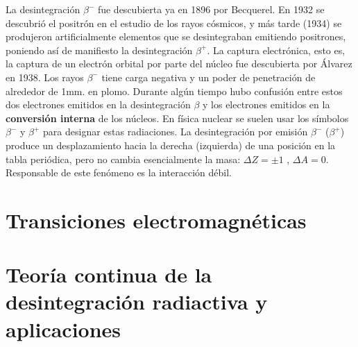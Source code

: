 La desintegración $\beta^-$ fue descubierta ya en 1896 por Becquerel. En 1932 se descubrió el positrón en el estudio de los rayos cósmicos, y más tarde (1934) se produjeron artificialmente elementos que se desintegraban emitiendo positrones, poniendo así de manifiesto la desintegración $\beta^+$. La captura electrónica, esto es, la captura de un electrón orbital por parte del núcleo fue descubierta por Álvarez en 1938. Los rayos $\beta^-$ tiene carga negativa y un poder de penetración de alrededor de 1mm. en plomo. Durante algún tiempo hubo confusión entre estos dos electrones emitidos en la desintegración $\beta$ y los electrones emitidos en la \textbf{conversión interna} de los núcleos. En física nuclear se suelen usar los símbolos $\beta^-$ y $\beta^+$ para designar estas radiaciones. La desintegración por emisión $\beta^-$ ($\beta^+$) produce un desplazamiento hacia la derecha (izquierda) de una posición en la tabla periódica, pero no cambia esencialmente la masa: $\Delta Z= \pm 1$ , $\Delta A = 0$. Responsable de este fenómeno es la interacción débil.

\section{Transiciones electromagnéticas}

\section{Teoría continua de la desintegración radiactiva y aplicaciones}

